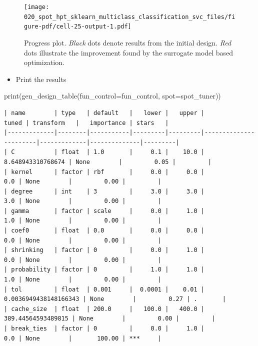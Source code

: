\documentclass[
  letterpaper,
  DIV=11,
  numbers=noendperiod]{scrreprt}
\newenvironment{Shaded}{\begin{snugshade}}{\end{snugshade}}
\newcommand{\BuiltInTok}[1]{\textcolor[rgb]{0.00,0.23,0.31}{#1}}
\newcommand{\NormalTok}[1]{\textcolor[rgb]{0.00,0.23,0.31}{#1}}
\newcommand{\OperatorTok}[1]{\textcolor[rgb]{0.37,0.37,0.37}{#1}}
\providecommand{\tightlist}{%
  \setlength{\itemsep}{0pt}\setlength{\parskip}{0pt}}\usepackage{longtable,booktabs,array}
\begin{document}
\begin{figure}[H]

{\centering \texttt{[image: 020\_spot\_hpt\_sklearn\_multiclass\_classification\_svc\_files/figure-pdf/cell-25-output-1.pdf]}

}

\caption{Progress plot. \emph{Black} dots denote results from the
initial design. \emph{Red} dots illustrate the improvement found by the
surrogate model based optimization.}

\end{figure}

\begin{itemize}
\tightlist
\item
  Print the results
\end{itemize}

\begin{Shaded}
\begin{Highlighting}[]
\BuiltInTok{print}\NormalTok{(gen\_design\_table(fun\_control}\OperatorTok{=}\NormalTok{fun\_control,}
\NormalTok{    spot}\OperatorTok{=}\NormalTok{spot\_tuner))}
\end{Highlighting}
\end{Shaded}

\begin{verbatim}
| name        | type   | default   |   lower |   upper |                 tuned | transform   |   importance | stars   |
|-------------|--------|-----------|---------|---------|-----------------------|-------------|--------------|---------|
| C           | float  | 1.0       |     0.1 |    10.0 |     8.648943310768674 | None        |         0.05 |         |
| kernel      | factor | rbf       |     0.0 |     0.0 |                   0.0 | None        |         0.00 |         |
| degree      | int    | 3         |     3.0 |     3.0 |                   3.0 | None        |         0.00 |         |
| gamma       | factor | scale     |     0.0 |     1.0 |                   1.0 | None        |         0.00 |         |
| coef0       | float  | 0.0       |     0.0 |     0.0 |                   0.0 | None        |         0.00 |         |
| shrinking   | factor | 0         |     0.0 |     1.0 |                   0.0 | None        |         0.00 |         |
| probability | factor | 0         |     1.0 |     1.0 |                   1.0 | None        |         0.00 |         |
| tol         | float  | 0.001     |  0.0001 |    0.01 | 0.0036949438148166343 | None        |         0.27 | .       |
| cache_size  | float  | 200.0     |   100.0 |   400.0 |    389.44564593489815 | None        |         0.00 |         |
| break_ties  | factor | 0         |     0.0 |     1.0 |                   0.0 | None        |       100.00 | ***     |
\end{verbatim}
\end{document}
